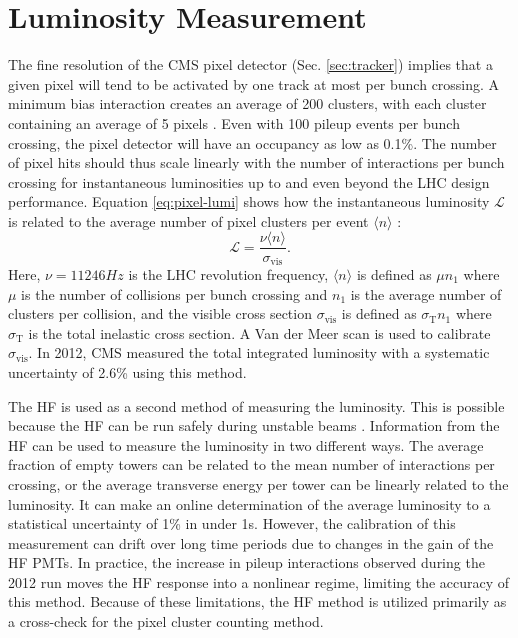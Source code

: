 \section{Luminosity Measurement
\label{sec:lumimeas}}

The fine resolution of the CMS pixel detector (Sec. \ref{sec:tracker}) implies that a given pixel will tend to be activated by one track at most per bunch crossing. A minimum bias interaction creates an average of 200 clusters, with each cluster containing an average of 5 pixels \cite{CMS-PAS-LUM-12-001}. Even with 100 pileup events per bunch crossing, the pixel detector will have an occupancy as low as 0.1\%. The number of pixel hits should thus scale linearly with the number of interactions per bunch crossing for instantaneous luminosities up to and even beyond the LHC design performance. Equation \eqref{eq:pixel-lumi} shows how the instantaneous luminosity $\mathcal{L}$ is related to the average number of pixel clusters per event $\langle n \rangle$ \cite{CMS-PAS-LUM-13-001}:
\begin{equation} \label{eq:pixel-lumi}
\mathcal{L} = \frac{\nu \langle n \rangle}{\sigma_\text{vis}}.
\end{equation}
Here, $\nu = 11246\unit{Hz}$ is the LHC revolution frequency, $\langle n \rangle$ is defined as $\mu n_{1}$ where $\mu$ is the number of collisions per bunch crossing and $n_{1}$ is the average number of clusters per collision, and the visible cross section $\sigma_\text{vis}$ is defined as $\sigma_\text{T} n_{1}$ where $\sigma_\text{T}$ is the total inelastic cross section. A Van der Meer scan \cite{Balagura:2011yw} is used to calibrate $\sigma_\text{vis}$. In 2012, CMS measured the total integrated luminosity with a systematic uncertainty of 2.6\% using this method.

The HF is used as a second method of measuring the luminosity. This is possible because the HF can be run safely during unstable beams \cite{CMS-PAS-LUM-13-001}. Information from the HF can be used to measure the luminosity in two different ways. The average fraction of empty towers can be related to the mean number of interactions per crossing, or the average transverse energy per tower can be linearly related to the luminosity. It can make an online determination of the average luminosity to a statistical uncertainty of 1\% in under 1\unit{s}. However, the calibration of this measurement can drift over long time periods due to changes in the gain of the HF PMTs. In practice, the increase in pileup interactions observed during the 2012 run moves the HF response into a nonlinear regime, limiting the accuracy of this method. Because of these limitations, the HF method is utilized primarily as a cross-check for the pixel cluster counting method.